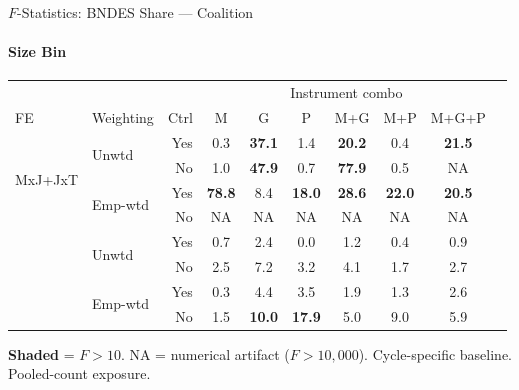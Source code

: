 \documentclass[aspectratio=169,10pt]{beamer}
\newcommand{\fpass}[1]{\cellcolor{pass}\textbf{#1}}
\begin{document}
\begin{frame}[t]{$F$-Statistics: BNDES Share --- Coalition}
\framesubtitle{Size Bin}
\begin{center}
\footnotesize
\setlength{\tabcolsep}{3.5pt}
\renewcommand{\arraystretch}{1.05}
\begin{tabular}{@{}llrccccccc@{}}
\toprule
 & & & \multicolumn{6}{c}{Instrument combo} \\
\cmidrule(l{2pt}r{2pt}){4-9}
FE & Weighting & Ctrl & M & G & P & M+G & M+P & M+G+P \\
\midrule
  \multirow{4}{*}{MxJ+JxT} & \multirow{2}{*}{Unwtd} & Yes & 0.3 & \fpass{37.1} & 1.4 & \fpass{20.2} & 0.4 & \fpass{21.5} \\
   &  & No & 1.0 & \fpass{47.9} & 0.7 & \fpass{77.9} & 0.5 & NA \\
   & \multirow{2}{*}{Emp-wtd} & Yes & \fpass{78.8} & 8.4 & \fpass{18.0} & \fpass{28.6} & \fpass{22.0} & \fpass{20.5} \\
   &  & No & NA & NA & NA & NA & NA & NA \\
\addlinespace[5pt]
  \multirow{4}{*}{MxJ+MxT} & \multirow{2}{*}{Unwtd} & Yes & 0.7 & 2.4 & 0.0 & 1.2 & 0.4 & 0.9 \\
   &  & No & 2.5 & 7.2 & 3.2 & 4.1 & 1.7 & 2.7 \\
   & \multirow{2}{*}{Emp-wtd} & Yes & 0.3 & 4.4 & 3.5 & 1.9 & 1.3 & 2.6 \\
   &  & No & 1.5 & \fpass{10.0} & \fpass{17.9} & 5.0 & 9.0 & 5.9 \\
\bottomrule
\end{tabular}
\end{center}
{\scriptsize \colorbox{pass}{\textbf{Shaded}} = $F>10$. NA = numerical artifact ($F>10{,}000$). Cycle-specific baseline. Pooled-count exposure.}
\end{frame}
\end{document}
